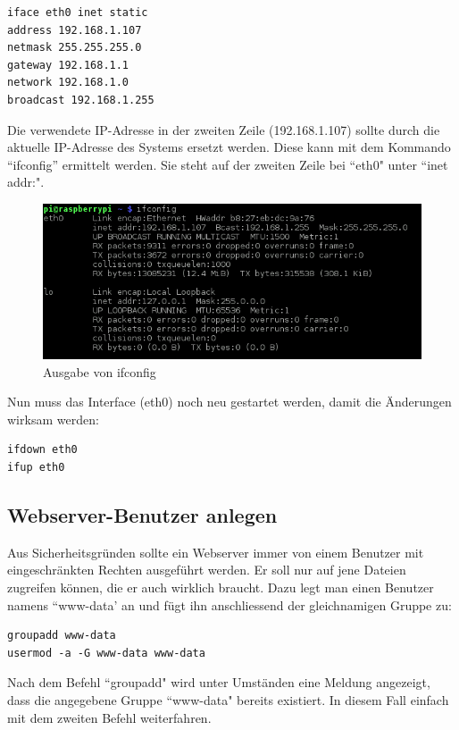 \begin{lstlisting}
iface eth0 inet static
address 192.168.1.107
netmask 255.255.255.0
gateway 192.168.1.1
network 192.168.1.0
broadcast 192.168.1.255
\end{lstlisting}

Die verwendete IP-Adresse in der zweiten Zeile (192.168.1.107) sollte durch die aktuelle IP-Adresse des Systems ersetzt werden. Diese kann mit dem Kommando ``ifconfig'' ermittelt werden. Sie steht auf der zweiten Zeile bei ``eth0" unter ``inet addr:".

\begin{figure}[h]
\centering
\includegraphics[scale=0.65]{images/ifconfig}
\caption{Ausgabe von ifconfig}
\end{figure}

Nun muss das Interface (eth0) noch neu gestartet werden, damit die Änderungen wirksam werden:

\begin{lstlisting}
ifdown eth0
ifup eth0
\end{lstlisting}

\subsection{Webserver-Benutzer anlegen}
Aus Sicherheitsgründen sollte ein Webserver immer von einem Benutzer mit eingeschränkten Rechten ausgeführt werden. Er soll nur auf jene Dateien zugreifen können, die er auch wirklich braucht. Dazu legt man einen Benutzer namens ``www-data' an und fügt ihn anschliessend der gleichnamigen Gruppe zu:

\begin{lstlisting}
groupadd www-data
usermod -a -G www-data www-data
\end{lstlisting}

Nach dem Befehl ``groupadd" wird unter Umständen eine Meldung angezeigt, dass die angegebene Gruppe ``www-data" bereits existiert. In diesem Fall einfach mit dem zweiten Befehl weiterfahren.

